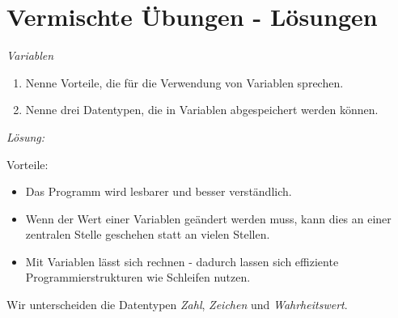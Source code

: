 \documentclass[ngerman, 11pt]{scrreprt}
\begin{document}
	\setcounter{chapter}{4}
	\setcounter{section}{7}
	\setcounter{aufgabennummer}{8}
	\onehalfspacing
	
	\section{Vermischte Übungen - Lösungen}
	
	\begin{aufgabe} \emph{Variablen}
		\begin{enumerate}[label=\alph*),itemsep=0mm, parsep=0mm]
			\item Nenne Vorteile, die für die Verwendung von Variablen sprechen.
			\item Nenne drei Datentypen, die in Variablen abgespeichert werden können.
		\end{enumerate}
	\end{aufgabe}

	\bigskip
	\emph{Lösung:}
	
	Vorteile:
	\begin{itemize}
		\item Das Programm wird lesbarer und besser verständlich.
		\item Wenn der Wert einer Variablen geändert werden muss, kann dies an einer zentralen Stelle geschehen statt an vielen Stellen.
		\item Mit Variablen lässt sich rechnen - dadurch lassen sich effiziente Programmierstrukturen wie Schleifen nutzen.
	\end{itemize}
	
	Wir unterscheiden die Datentypen \emph{Zahl}, \emph{Zeichen} und \emph{Wahrheitswert}.
	
\end{document}
